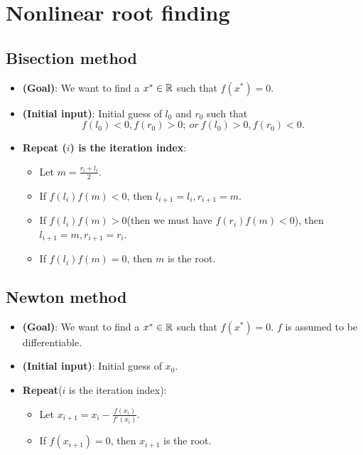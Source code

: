 \begin{refsection}
\begin{lemma}
\end{lemma}


\section{Nonlinear root finding}
\subsection{Bisection method}

\begin{definition}\hfill
\begin{itemize}
	\item \textbf{(Goal)}: We want to find a $x^*\in \mathbb{R}$ such that $f(x^*) = 0$.
	\item \textbf{(Initial input)}: Initial guess of $l_0$ and $r_0$ such that 
	$$f(l_0) < 0, f(r_0) > 0; ~or~ f(l_0) > 0, f(r_0) < 0.$$
	\item \textbf{Repeat ($i$) is the iteration index}: 
	\begin{itemize}
		\item Let $m = \frac{r_i + l_i}{2}$.
		\item If $f(l_i)f(m) < 0$, then $l_{i+1} = l_i, r_{i+1} = m$.
		\item If $f(l_i)f(m) > 0$(then we must have $f(r_i)f(m)<0$), then $l_{i+1} = m, r_{i+1} = r_i$.
		\item If $f(l_i)f(m) = 0$, then $m$ is the root.
	\end{itemize}
\end{itemize}	
	
\end{definition}


 \subsection{Newton method}
 
 \begin{definition}\hfill
 	\begin{itemize}
 		\item \textbf{(Goal)}: We want to find a $x^*\in \mathbb{R}$ such that $f(x^*) = 0$. $f$ is assumed to be differentiable.
 		\item \textbf{(Initial input)}: Initial guess of $x_0$.
 		\item \textbf{Repeat}($i$ is the iteration index): 
 		\begin{itemize}
 			\item Let $x_{i+1} = x_i - \frac{f(x_i)}{f'(x_i)}$.
 			\item If $f(x_{i+1}) = 0$, then $x_{i+1}$ is the root.
 		\end{itemize}
 	\end{itemize}	
 \end{definition}
 

\end{refsection}
